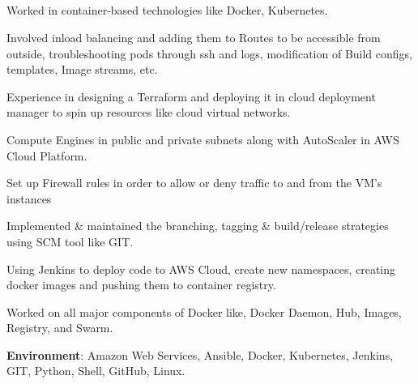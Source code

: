 \documentclass[10pt,a4paper,ragged2e,withhyper]{altacv}
\begin{document}
{\begin{paracol}{2}
    \large{
         \\
         \\
         \\
         \\
}

\switchcolumn
\newpage
{}
\begin{itemize}
\large{
    \item Worked in container-based technologies like Docker, Kubernetes.
    \item Involved inload balancing and adding them to Routes to be accessible from outside, troubleshooting pods through ssh and logs, modification of Build configs, templates, Image streams, etc.
    \item Experience in designing a Terraform and deploying it in cloud deployment manager to spin up resources like cloud virtual networks.
    \item Compute Engines in public and private subnets along with AutoScaler in AWS Cloud Platform.
    \item Set up Firewall rules in order to allow or deny traffic to and from the VM's instances 
    \item Implemented \& maintained the branching, tagging \& build/release strategies using SCM tool like GIT.
    \item Using Jenkins to deploy code to AWS Cloud, create new namespaces, creating docker images and pushing them to container registry.
    \item Worked on all major components of Docker like, Docker Daemon, Hub, Images, Registry, and Swarm.
}
\end{itemize}
\textbf{\large{Environment}}: Amazon Web Services, Ansible, Docker, Kubernetes,
Jenkins, GIT, Python, Shell, GitHub, Linux.


\end{paracol}}
\end{document}
